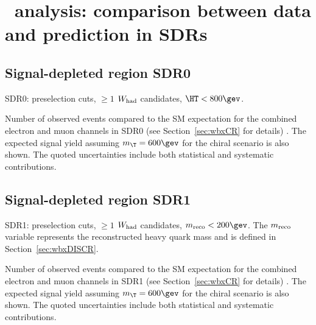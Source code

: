 \clearpage{\pagestyle{empty}\cleardoublepage}

\chapter{\wbx\ analysis: comparison between data and prediction in SDRs}\label{app:wbxSDRs}

\section{Signal-depleted region SDR0}
\label{sec:DataMC_CR0}

SDR0: preselection cuts, $\geq 1$ $W_{\rm had}$ candidates, $\HT<800\gev$. 

\begin{table}[h!]
\begin{center}

\caption{\small{Number of observed events compared to the SM expectation for
the combined electron and muon channels in SDR0 (see Section~\ref{sec:wbxCR} for details) . 
The expected signal yield assuming $m_{\T}=600\gev$ for the chiral scenario is also shown. 
The quoted uncertainties include both statistical and systematic contributions.}}
\label{tab:CR0_1W_evtable}
\end{center}
\end{table}

\clearpage
%


\clearpage

\section{Signal-depleted region SDR1}
\label{sec:DataMC_CR5}

SDR1: preselection cuts, $\geq 1$ $W_{\rm had}$ candidates, $m_{\rm reco}<200\gev$. The $m_{\rm reco}$ variable represents the
reconstructed heavy quark mass and is defined in Section~\ref{sec:wbxDISCR}. 

\begin{table}[h!]
\begin{center}

\caption{\small{Number of observed events compared to the SM expectation for
the combined electron and muon channels in SDR1 (see Section~\ref{sec:wbxCR} for details) . 
The expected signal yield assuming $m_{\T}=600\gev$ for the chiral scenario is also shown. 
The quoted uncertainties include both statistical and systematic contributions.}}
\label{tab:CR5_1W_evtable}
\end{center}
\end{table}

